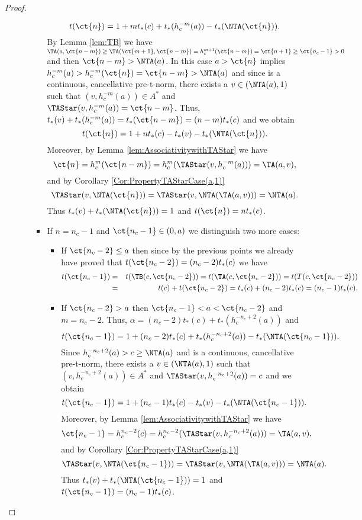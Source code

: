 \begin{proof}
\begin{enumerate}[label=(\roman*)]
\begin{itemize}
\begin{itemize}
				$$t(\ct{n})=1+mt_*(c)+t_*(h_c^{-m}(a))-t_*(\NTA(\ct{n})).$$
				By Lemma \ref{lem:TB} we have $\TA(a,\ct{n-m})\geq \TA(\ct{m+1},\ct{n-m})=h_c^{m+1}(\ct{n-m})=\ct{n+1} \geq \ct{n_c-1}>0$ and then $\ct{n-m}>\NTA(a)$. In this case $a > \ct{n}$ implies $h_c^{-m}(a)>h_c^{-m}(\ct{n})=\ct{n-m}>\NTA(a)$ and since \TAStar is a continuous, cancellative pre-t-norm, there exists a $v \in (\NTA(a),1)$ such that $(v,h_c^{-m}(a)) \in A^*$ and $\TAStar(v,h_c^{-m}(a))=\ct{n-m}$. Thus, $t_*(v)+t_*(h_c^{-m}(a))=t_*(\ct{n-m})=(n-m)t_*(c)$ and we obtain
				$$t(\ct{n})=1+nt_*(c)-t_*(v)-t_*(\NTA(\ct{n})).$$
				Moreover, by Lemma \ref{lem:AssociativitywithTAStar} we have
				$$\ct{n}=h_c^m(\ct{n-m})=h_c^m(\TAStar(v,h_c^{-m}(a)))=\TA(a,v),$$
				and by Corollary \ref{Cor:PropertyTAStarCase(a,1)}
				$$\TAStar(v,\NTA(\ct{n})) = \TAStar(v,\NTA(\TA(a,v))) = \NTA(a).$$
				Thus $t_*(v) + t_*(\NTA(\ct{n})) = 1$ and $t(\ct{n}) = nt_*(c)$.
				\item If $n=n_c-1$ and $\ct{n_c-1} \in (0,a)$ we distinguish two more cases:
				\begin{itemize}
					\item If $\ct{n_c-2} \leq a$ then since by the previous points we already have proved that $t(\ct{n_c-2})=(n_c-2)t_*(c)$ we have
					\begin{eqnarray*}
						t(\ct{n_c-1}) &=& t(\TB(c,\ct{n_c-2})) = t(\TA(c,\ct{n_c-2})) = t(T(c,\ct{n_c-2})) \\
						& = & t(c)+t(\ct{n_c-2}) = t_*(c)+(n_c-2)t_*(c)=(n_c-1)t_*(c).
					\end{eqnarray*}
					\item If $\ct{n_c-2}>a$ then $\ct{n_c-1} < a < \ct{n_c-2}$ and $m=n_c-2$. Thus, $\alpha=(n_c-2)t_*(c)+t_*(h_c^{-n_c+2}(a))$ and
					$$t(\ct{n_c-1})=1+(n_c-2)t_*(c)+t_*(h_c^{-n_c+2}(a))-t_*(\NTA(\ct{n_c-1})).$$
					Since $h_c^{-n_c+2}(a) > c \geq \NTA(a)$ and \TAStar is a continuous, cancellative pre-t-norm, there exists a $v \in (\NTA(a),1)$ such that $(v,h_c^{-n_c+2}(a)) \in A^*$ and $\TAStar(v, h_c^{-n_c+2}(a))=c$ and we obtain
					$$t(\ct{n_c-1}) = 1 + (n_c-1)t_*(c)-t_*(v)-t_*(\NTA(\ct{n_c-1})).$$
					Moreover, by Lemma \ref{lem:AssociativitywithTAStar} we have
					$$\ct{n_c-1}=h_c^{n_c-2}(c)= h_c^{n_c-2}(\TAStar(v, h_c^{-n_c+2}(a)))=\TA(a,v),$$
					and by Corollary \ref{Cor:PropertyTAStarCase(a,1)}
					$$\TAStar(v,\NTA(\ct{n_c-1})) = \TAStar(v,\NTA(\TA(a,v))) = \NTA(a).$$
					Thus $t_*(v) + t_*(\NTA(\ct{n_c-1})) = 1$ and $t(\ct{n_c-1}) = (n_c-1)t_*(c)$.
				\end{itemize}
				

\end{itemize}
\end{itemize}
\end{enumerate}
\end{proof}
